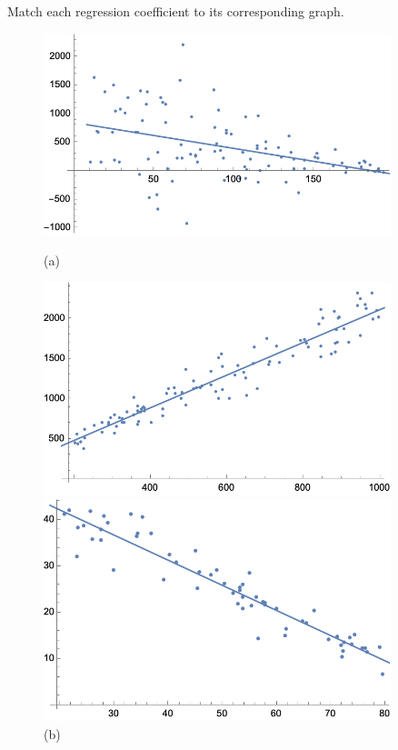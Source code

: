 \documentclass[11pt,letterpaper]{article}
\begin{document}
 Match each regression coefficient to its corresponding graph. 
	\begin{figure}[!ht]
	\centering
	\begin{minipage}{0.45\textwidth}
	   \centering
	   \includegraphics[width=0.9\textwidth]{reg1.png}
	   \caption*{(a)}
	\end{minipage}\hfill
	\begin{minipage}{0.45\textwidth}
	   \centering
	   \includegraphics[width=0.9\textwidth]{reg2.png}
	   \caption*{(b)}
	\end{minipage}
	\begin{minipage}{0.45\textwidth}
	   \centering
	   \includegraphics[width=0.9\textwidth]{reg3.png}

\end{minipage}
\end{figure}
\end{document}
